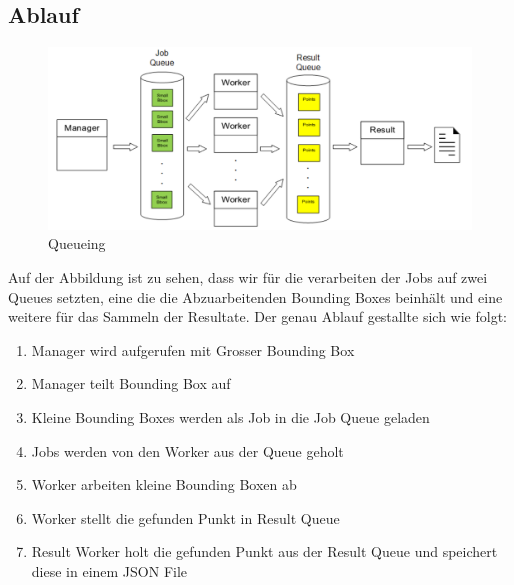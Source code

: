 \subsection{Ablauf}
\begin{figure}[H]
\includegraphics[width=\textwidth]{images/queuing.png}
\caption[Queueing]{Queueing}
\end{figure}
Auf der Abbildung ist zu sehen, dass wir für die verarbeiten der Jobs auf zwei Queues setzten, eine die die Abzuarbeitenden Bounding Boxes beinhält und eine weitere für das Sammeln der Resultate. Der genau Ablauf gestallte sich wie folgt:
\begin{enumerate}
		\item Manager wird aufgerufen mit Grosser Bounding Box
		\item Manager teilt Bounding Box auf
		\item Kleine Bounding Boxes werden als Job in die Job Queue geladen
		\item Jobs werden von den Worker aus der Queue geholt
		\item Worker arbeiten kleine Bounding Boxen ab
		\item Worker stellt die gefunden Punkt in Result Queue
		\item Result Worker holt die gefunden Punkt aus der Result Queue und speichert diese in einem JSON File 
\end{enumerate}









